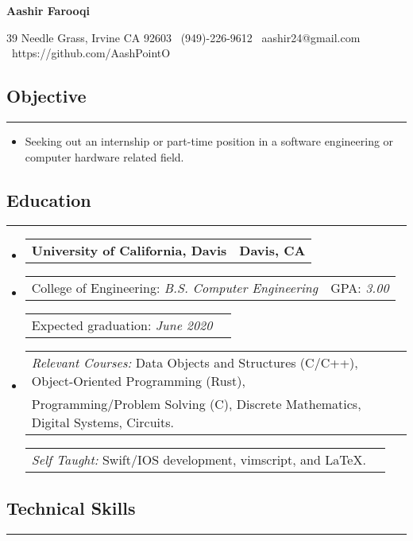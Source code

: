 \documentclass[10pt,letterpaper]{article}
\makeatletter
\newcommand{\header}[2]
{
	\begin{tabular*}{\linewidth}{l @{\extracolsep{\fill}} r}
		#1 & #2 \\
	\end{tabular*}
}
\newcommand{\sectionbreak}
{
	\vspace{-1.2em}
	\rule{\textwidth}{1.7pt}
	\vspace{-1.7em}
}
\makeatother
\begin{document}
\begin{center}
{\LARGE \textbf{Aashir Farooqi}}

\vspace{0.5em}
39 Needle Grass, Irvine CA 92603 \textbar 
\ (949)-226-9612 \textbar 
\ aashir24@gmail.com \textbar
\ https://github.com/AashPointO 
\\
\end{center}
\vspace{-1.5em}

\subsection*{Objective}
\sectionbreak

\begin{itemize}
	\item[] Seeking out an internship or part-time position in a software engineering or computer hardware related field.

\end{itemize}

\vspace{-1.5em}

\subsection*{Education}
\sectionbreak

\begin{itemize}

\item[] 
	\header 
		{\textbf{University of California, Davis}}
		{\textbf{Davis, CA}}
\item[]
	\header
		{College of Engineering: \emph{B.S. Computer Engineering}}
		{GPA: \emph{3.00}}
	\header
		{Expected graduation: \emph{June 2020}}	
		{}
\item[]
	\header
		{\emph{Relevant Courses:} Data Objects and Structures (C/C++), Object-Oriented Programming (Rust), \\ \hspace{7.25em} Programming/Problem Solving (C), Discrete Mathematics, Digital Systems, Circuits.} 
		{}
	\header
		{\emph{Self Taught:} \hspace{2.0em} Swift/IOS development, vimscript, and \LaTeX.}
		{}
	
\end{itemize}

\vspace{-2.5em}

\subsection*{Technical Skills}
\sectionbreak
\end{document}
